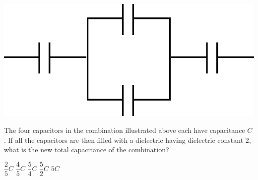 \begin{center}
\includegraphics[scale=0.3]{images/img-008-009.png}
\end{center}

\begin{questions}\setcounter{question}{14}\question
The four capacitors in the combination illustrated above each have capacitance $C$. If all the capacitors are then filled with a dielectric having dielectric constant 2, what is the new total capacitance of the combination?

\begin{oneparchoices}
\choice $\dfrac{2}{5} C$
\choice $\dfrac{4}{5} C$
\choice $\dfrac{5}{4} C$
\choice $\dfrac{5}{2} C$
\choice $5 C$
\end{oneparchoices}\end{questions}

